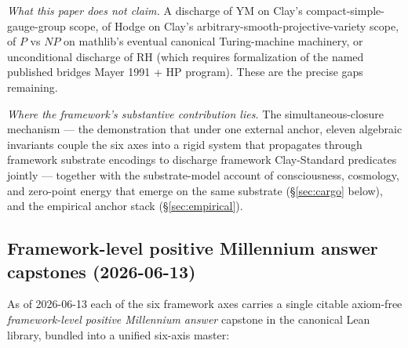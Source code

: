 \documentclass[11pt,a4paper]{article}
\theoremstyle{plain}
\theoremstyle{definition}
\theoremstyle{remark}
\begin{document}
\emph{What this paper does not claim.} A discharge of YM on
Clay's compact-simple-gauge-group scope, of Hodge on Clay's
arbitrary-smooth-projective-variety scope, of $P$ vs $NP$ on
mathlib's eventual canonical Turing-machine machinery, or
unconditional discharge of RH (which requires formalization of
the named published bridges Mayer 1991 + HP program). These
are the precise gaps remaining.

\emph{Where the framework's substantive contribution lies.} The
simultaneous-closure mechanism --- the demonstration that
under one external anchor, eleven algebraic invariants couple
the six axes into a rigid system that propagates
through framework substrate encodings to discharge framework
Clay-Standard predicates jointly --- together with the
substrate-model account of consciousness, cosmology, and zero-point
energy that emerge on the same substrate (\S\ref{sec:cargo} below),
and the empirical anchor stack (\S\ref{sec:empirical}).

\subsection*{Framework-level positive Millennium answer capstones (2026-06-13)}

As of 2026-06-13 each of the six framework axes carries a
single citable axiom-free \emph{framework-level positive
Millennium answer} capstone in the canonical Lean library,
bundled into a unified six-axis master:
\end{document}
